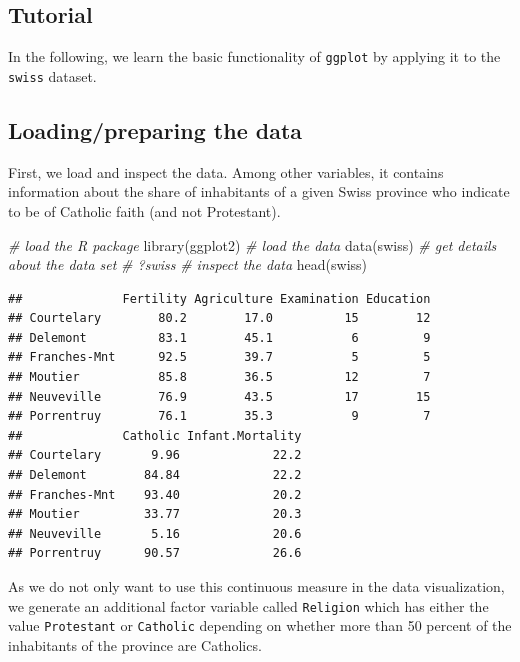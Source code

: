 \documentclass[
  12pt,
]{style/krantz}
\newenvironment{Shaded}{\begin{snugshade}}{\end{snugshade}}
\newcommand{\CommentTok}[1]{\textcolor[rgb]{0.56,0.35,0.01}{\textit{#1}}}
\newcommand{\FunctionTok}[1]{\textcolor[rgb]{0.00,0.00,0.00}{#1}}
\newcommand{\NormalTok}[1]{#1}
\begin{document}
\hypertarget{tutorial}{%
\subsection{Tutorial}\label{tutorial}}

In the following, we learn the basic functionality of \texttt{ggplot} by applying it to the \texttt{swiss} dataset.

\hypertarget{loadingpreparing-the-data}{%
\subsection{Loading/preparing the data}\label{loadingpreparing-the-data}}

First, we load and inspect the data. Among other variables, it contains information about the share of inhabitants of a given Swiss province who indicate to be of Catholic faith (and not Protestant).

\begin{Shaded}
\begin{Highlighting}[]
\CommentTok{\# load the R package}
\FunctionTok{library}\NormalTok{(ggplot2)}
\CommentTok{\# load the data}
\FunctionTok{data}\NormalTok{(swiss)}
\CommentTok{\# get details about the data set}
\CommentTok{\# ?swiss}
\CommentTok{\# inspect the data}
\FunctionTok{head}\NormalTok{(swiss)}
\end{Highlighting}
\end{Shaded}

\begin{verbatim}
##              Fertility Agriculture Examination Education
## Courtelary        80.2        17.0          15        12
## Delemont          83.1        45.1           6         9
## Franches-Mnt      92.5        39.7           5         5
## Moutier           85.8        36.5          12         7
## Neuveville        76.9        43.5          17        15
## Porrentruy        76.1        35.3           9         7
##              Catholic Infant.Mortality
## Courtelary       9.96             22.2
## Delemont        84.84             22.2
## Franches-Mnt    93.40             20.2
## Moutier         33.77             20.3
## Neuveville       5.16             20.6
## Porrentruy      90.57             26.6
\end{verbatim}

As we do not only want to use this continuous measure in the data visualization, we generate an additional factor variable called \texttt{Religion} which has either the value \texttt{\textquotesingle{}Protestant\textquotesingle{}} or \texttt{\textquotesingle{}Catholic\textquotesingle{}} depending on whether more than 50 percent of the inhabitants of the province are Catholics.
\end{document}
